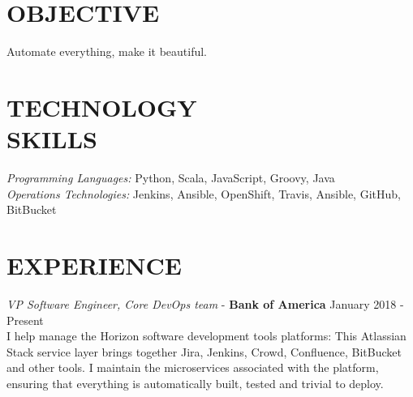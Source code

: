 \documentclass[margin, 10pt]{res} %
\begin{document}
    \begin{resume}


        \section{OBJECTIVE}

        Automate everything, make it beautiful.


        \section{TECHNOLOGY \\ SKILLS}

        {\sl Programming Languages:} Python, Scala, JavaScript, Groovy, Java \\
        {\sl Operations Technologies:} Jenkins, Ansible, OpenShift, Travis, Ansible, GitHub, BitBucket\\


        \section{EXPERIENCE}

        {\sl VP Software Engineer, Core DevOps team} - \textbf{Bank of America} \hfill January 2018 - Present \\

        I help manage the Horizon software development tools platforms: This Atlassian Stack service layer
        brings together Jira, Jenkins, Crowd, Confluence, BitBucket and other tools. I maintain the
        microservices associated with the platform, ensuring that everything is automatically built,
        tested and trivial to deploy.


\end{resume}
\end{document}
